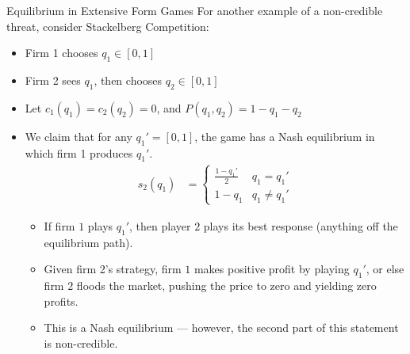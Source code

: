 \documentclass[10pt]{extarticle}
\begin{document}
\begin{problem}{Equilibrium in Extensive Form Games}
    For another example of a non-credible threat, consider Stackelberg Competition:
    \begin{itemize}
      \item Firm 1 chooses $q_1 \in [0,1]$
      \item Firm 2 sees $q_1$, then chooses $q_2\in[0,1]$
      \item Let $c_1(q_1) = c_2(q_2) = 0$, and $P(q_1,q_2) = 1-q_1-q_2$
      \item We claim that for any $q_1' = [0,1]$, the game has a Nash equilibrium in which firm 1 produces $q_1'$.
        \begin{align*}
          s_2(q_1) &= \begin{cases}
            \frac{1-q_1'}{2}&q_1=q_1'\\
            1-q_1 & q_1\neq q_1'
          \end{cases}
        \end{align*}
        \begin{itemize}
          \item If firm $1$ plays $q_1'$, then player $2$ plays its best response (anything off the equilibrium path).
          \item Given firm 2's strategy, firm $1$ makes positive profit by playing $q_1'$, or else firm $2$ floods the market, pushing the price to zero and yielding zero profits.
          \item This is a Nash equilibrium --- however, the second part of this statement is non-credible.
        \end{itemize}
    \end{itemize}
  \end{problem}
\end{document}
